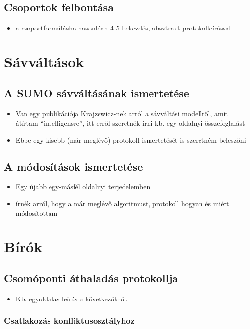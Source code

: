\documentclass{report}
\begin{document}
			\subsection{Csoportok felbontása}
				\begin{itemize}
					\item a csoportformálásho hasonlóan 4-5 bekezdés, absztrakt protokolleírással
				\end{itemize}
		\section{Sávváltások}
			\subsection{A SUMO sávváltásának ismertetése}
				\begin{itemize}
					\item Van egy publikációja Krajzewicz-nek arról a sávváltási modellről, amit átírtam ``intelligensre'', itt erről szeretnék írni kb. egy oldalnyi összefoglalást
					\item Ebbe egy kisebb (már meglévő) protokoll ismertetését is szeretném beleszőni
				\end{itemize}
			\subsection{A módosítások ismertetése}
				\begin{itemize}
					\item Egy újabb egy-másfél oldalnyi terjedelemben
					\item írnék arról, hogy a már meglévő algoritmust, protokoll hogyan és miért módosítottam
				\end{itemize}
	\section{Bírók}
		\subsection{Csomóponti áthaladás protokollja}
			\begin{itemize}
					\item Kb. egyoldalas leírás a következőkről:
			\end{itemize}
			\subsubsection{Csatlakozás konfliktusosztályhoz}
\end{document}
